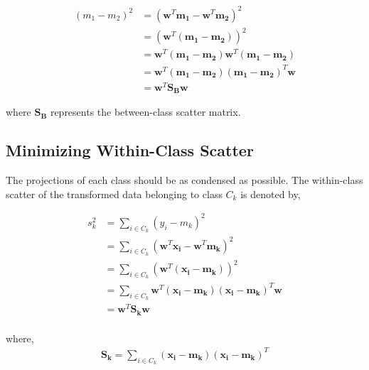 \documentclass[11pt, a4paper]{article}
\begin{document}
\begin{align*}
	(m_1 - m_2)^2 & = (\boldsymbol{w}^T\boldsymbol{m_1} - \boldsymbol{w}^T\boldsymbol{m_2})^2                                    \\
	              & = (\boldsymbol{w}^T(\boldsymbol{m_1} - \boldsymbol{m_2}))^2                                                  \\
	              & = \boldsymbol{w}^T(\boldsymbol{m_1} - \boldsymbol{m_2})\boldsymbol{w}^T(\boldsymbol{m_1} - \boldsymbol{m_2}) \\
	              & = \boldsymbol{w}^T(\boldsymbol{m_1} - \boldsymbol{m_2})(\boldsymbol{m_1} - \boldsymbol{m_2})^T\boldsymbol{w} \\
	              & = \boldsymbol{w}^T\boldsymbol{S_B}\boldsymbol{w}                                                             
\end{align*} 

where $\boldsymbol{S_B}$ represents the between-class scatter matrix.

\subsection{Minimizing Within-Class Scatter}

The projections of each class should be as condensed as possible. The within-class scatter of the transformed data belonging to class $C_k$ is denoted by,

\begin{align*}
	s_k^2 & = \sum_{i \in C_k} (y_i - m_k)^2                                                                                            \\
	      & = \sum_{i \in C_k} (\boldsymbol{w}^T\boldsymbol{x_i} - \boldsymbol{w}^T\boldsymbol{m_k})^2                                  \\
	      & = \sum_{i \in C_k} (\boldsymbol{w}^T(\boldsymbol{x_i} -\boldsymbol{m_k}))^2                                                 \\
	      & = \sum_{i \in C_k} \boldsymbol{w}^T(\boldsymbol{x_i} -\boldsymbol{m_k})(\boldsymbol{x_i} -\boldsymbol{m_k})^T\boldsymbol{w} \\
	      & = \boldsymbol{w}^T \boldsymbol{S_k} \boldsymbol{w}                                                                          \\
\end{align*}  

where,
\begin{align*}
	\boldsymbol{S_k} = \sum_{i \in C_k}(\boldsymbol{x_i} -\boldsymbol{m_k})(\boldsymbol{x_i} -\boldsymbol{m_k})^T 
\end{align*}
\end{document}
